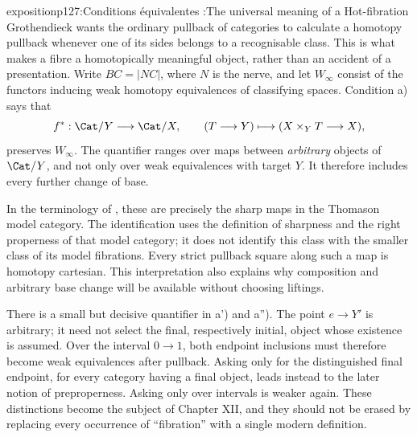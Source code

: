 
\begin{dcomment}{exposition}{p127:Conditions équivalentes :}{The universal meaning of a Hot-fibration}
Grothendieck wants the ordinary pullback of categories to calculate a homotopy pullback whenever one of its sides belongs to a recognisable class. This is what makes a fibre a homotopically meaningful object, rather than an accident of a presentation. Write \(BC=|NC|\), where \(N\) is the nerve, and let \(W_\infty\) consist of the functors inducing weak homotopy equivalences of classifying spaces. Condition a) says that
\[
 f^*:\Cat/Y\longrightarrow\Cat/X,\qquad
 (T\longrightarrow Y)\longmapsto(X\times_Y T\longrightarrow X),
\]
preserves \(W_\infty\). The quantifier ranges over maps between \emph{arbitrary} objects of \(\Cat/Y\), and not only over weak equivalences with target \(Y\). It therefore includes every further change of base.

In the terminology of \citet[\S2, Proposition 2.7]{Rezk1998Sharp}, these are precisely the sharp maps in the Thomason model category. The identification uses the definition of sharpness and the right properness of that model category; it does not identify this class with the smaller class of its model fibrations. Every strict pullback square along such a map is homotopy cartesian. This interpretation also explains why composition and arbitrary base change will be available without choosing liftings.

There is a small but decisive quantifier in a') and a''). The point \(e\longrightarrow Y'\) is arbitrary; it need not select the final, respectively initial, object whose existence is assumed. Over the interval \(0\longrightarrow1\), both endpoint inclusions must therefore become weak equivalences after pullback. Asking only for the distinguished final endpoint, for every category having a final object, leads instead to the later notion of preproperness. Asking only over intervals is weaker again. These distinctions become the subject of Chapter XII, and they should not be erased by replacing every occurrence of “fibration” with a single modern definition.
\end{dcomment}

